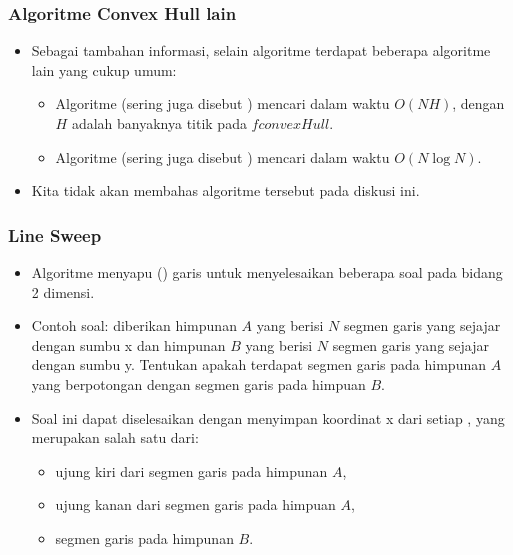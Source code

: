 \begin{frame}
\frametitle{Algoritme Convex Hull lain}
\begin{itemize}
  \item Sebagai tambahan informasi, selain algoritme \fGrahamScan terdapat beberapa algoritme lain yang cukup umum:
  \begin{itemize}
    \item Algoritme  (sering juga disebut ) mencari \fconvexHull dalam waktu $O(NH)$, dengan $H$ adalah banyaknya titik pada $fconvexHull$.
    \item Algoritme  (sering juga disebut ) mencari \fconvexHull dalam waktu $O(N \log N)$.
  \end{itemize}
  \item Kita tidak akan membahas algoritme tersebut pada diskusi ini.
\end{itemize}
\end{frame}

\begin{frame}[fragile]
\frametitle{Line Sweep}
\begin{itemize}
  \item Algoritme  menyapu (\xspace) garis untuk menyelesaikan beberapa soal pada bidang 2 dimensi.
  \item Contoh soal: diberikan himpunan $A$ yang berisi $N$ segmen garis yang sejajar dengan sumbu x dan himpunan $B$ yang berisi $N$ segmen garis yang sejajar dengan sumbu y. Tentukan apakah terdapat segmen garis pada himpunan $A$ yang berpotongan dengan segmen garis pada himpuan $B$.
  \item Soal ini dapat diselesaikan dengan menyimpan koordinat x dari setiap , yang merupakan salah satu dari:
  \begin{itemize}
    \item ujung kiri dari segmen garis pada himpunan $A$,
    \item ujung kanan dari segmen garis pada himpuan $A$,
    \item segmen garis pada himpunan $B$.
  \end{itemize}
\end{itemize}
\end{frame}

